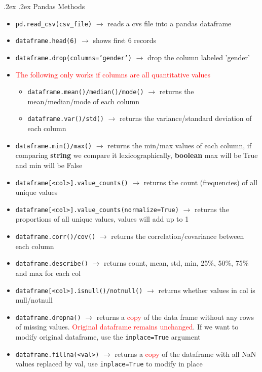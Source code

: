 \documentclass[10pt,landscape,a4paper]{article}
\makeatletter
\renewcommand{\subsection}{\@startsection{subsection}{1}{0mm}%
	{.2ex}%
	{.2ex}%
	{\sffamily\bfseries}}
\makeatother
\begin{document}
\begin{multicols*}{4}
		\subsection{Pandas Methods}
		\begin{itemize}
			\item \texttt{pd.read\_csv(csv\_file)} $\rightarrow$ reads a cvs file into a pandas dataframe
			\item \texttt{dataframe.head(6)} $\rightarrow$ shows first 6 records
			\item \texttt{dataframe.drop(columns='gender')} $\rightarrow$ drop the column labeled 'gender'
			\item \textcolor{red}{The following only works if columns are all quantitative values}
			\begin{itemize}
				\item \texttt{dataframe.mean()/median()/mode()} $\rightarrow$ returns the mean/median/mode of each column
				\item \texttt{dataframe.var()/std()} $\rightarrow$ returns the variance/standard deviation of each column 
			\end{itemize}
			\item \texttt{dataframe.min()/max()} $\rightarrow$ returns the min/max values of each column, if comparing \textbf{string} we compare it lexicographically, \textbf{boolean} max will be True and min will be False
			\item \texttt{dataframe[<col>].value\_counts()} $\rightarrow$ returns the count (frequencies) of all unique values
			\item \texttt{dataframe[<col>].value\_counts(normalize=True)} $\rightarrow$ returns the proportions of all unique values, values will add up to 1
			\item \texttt{dataframe.corr()/cov()} $\rightarrow$ returns the correlation/covariance between each column
			\item \texttt{dataframe.describe()} $\rightarrow$ returns count, mean, std, min, 25\%, 50\%, 75\% and max for each col 
			\item \texttt{dataframe[<col>].isnull()/notnull()} $\rightarrow$ returns whether values in col is null/notnull
			\item \texttt{dataframe.dropna()} $\rightarrow$ returns a \textcolor{red}{copy} of the data frame without any rows of missing values. \textcolor{red}{Original dataframe remains unchanged}. If we want to modify original dataframe, use the \texttt{inplace=True} argument
			\item \texttt{dataframe.fillna(<val>)} $\rightarrow$ returns a \textcolor{red}{copy} of the dataframe with all NaN values replaced by val, use \texttt{inplace=True} to modify in place

\end{itemize}
\end{multicols*}
\end{document}
